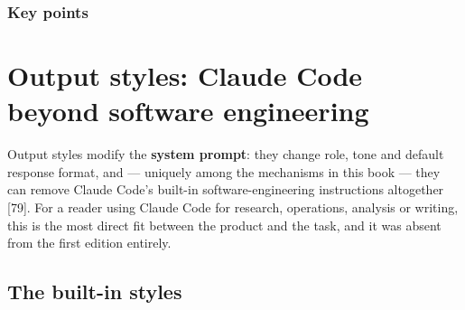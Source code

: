 \documentclass[11pt,a4paper,twoside,openany]{book}
\newcommand{\chaptertitlelabel}{}
\begin{document}
  \subsection*{Key points}
  \begin{itemize}\kprows\end{itemize}
\else
  \noindent\kpbody
\fi
\par\addvspace{1.4mm}
\endgroup

\FloatBarrier
\renewcommand{\chaptertitlelabel}{Part IV \textperiodcentered\ Chapter 19}
\setcounter{chapter}{18}
\chapter{Output styles: Claude Code beyond software engineering}

Output styles modify the \textbf{system prompt}: they change role, tone and default response format, and — uniquely among the mechanisms in this book — they can remove Claude Code's built-in software-engineering instructions altogether [79]. For a reader using Claude Code for research, operations, analysis or writing, this is the most direct fit between the product and the task, and it was absent from the first edition entirely.


\FloatBarrier
\setcounter{section}{0}
\section{The built-in styles}
\end{document}
